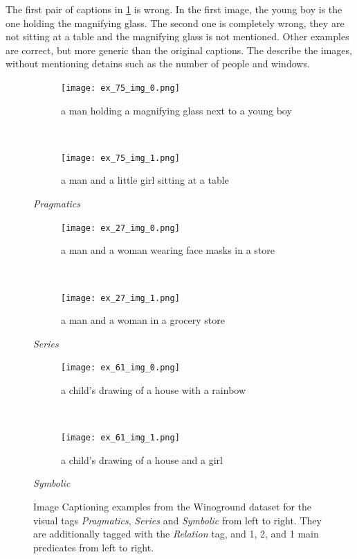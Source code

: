 The first pair of captions in \cref{fig:captioning-examples-visual} is wrong. In the first image, the young boy is the one holding the magnifying glass. The second one is completely wrong, they are not sitting at a table and the magnifying glass is not mentioned. Other examples are correct, but more generic than the original captions. The describe the images, without mentioning detains such as the number of people and windows.

\begin{figure}[ht]
\centering
    \begin{minipage}{.30\textwidth}
        \begin{subfigure}{\textwidth}
        \centering
        \texttt{[image: ex\_75\_img\_0.png]}
        \caption{a man holding a magnifying glass next to a young boy}
        \end{subfigure}\\
        \begin{subfigure}{\textwidth}
        \centering
        \texttt{[image: ex\_75\_img\_1.png]}
        \caption{a man and a little girl sitting at a table}
        \end{subfigure}%
        \caption*{\textit{Pragmatics}}
    \end{minipage}
    \hfill
    \begin{minipage}{.30\textwidth}
        \begin{subfigure}{\textwidth}
        \centering
        \texttt{[image: ex\_27\_img\_0.png]}
        \caption{a man and a woman wearing face masks in a store}
        \end{subfigure}\\
        \begin{subfigure}{\textwidth}
        \centering
        \texttt{[image: ex\_27\_img\_1.png]}
        \caption{a man and a woman in a grocery store}
        \end{subfigure}%
        \caption*{\textit{Series}}
    \end{minipage}
    \hfill
    \begin{minipage}{.30\textwidth}
        \begin{subfigure}{\textwidth}
        \centering
        \texttt{[image: ex\_61\_img\_0.png]}
        \caption{a child's drawing of a house with a rainbow}
        \end{subfigure}\\
        \begin{subfigure}{\textwidth}
        \centering
        \texttt{[image: ex\_61\_img\_1.png]}
        \caption{a child's drawing of a house and a girl}
        \end{subfigure}%
        \caption*{\textit{Symbolic}}
    \end{minipage}
    \caption{Image Captioning examples from the Winoground dataset for the visual tags \textit{Pragmatics}, \textit{Series} and \textit{Symbolic} from left to right. They are additionally tagged with the \textit{Relation} tag, and 1, 2, and 1 main predicates from left to right.}
    \label{fig:captioning-examples-visual}
\end{figure}

